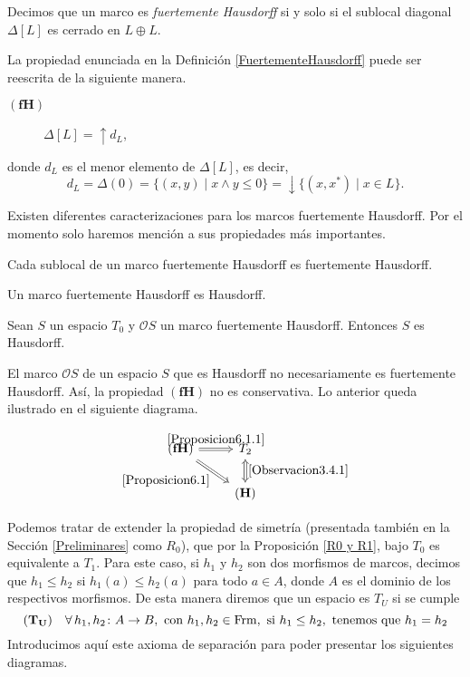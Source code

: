 \documentclass{comunicaciones}
\begin{document}
\begin{dfn}\label{FuertementeHausdorff}
    Decimos que un marco es \emph{fuertemente Hausdorff} si y solo si el sublocal diagonal $\Delta[L]$ es cerrado en $L\oplus L$.
\end{dfn}

La propiedad enunciada en la Definición \ref{FuertementeHausdorff} puede ser reescrita de la siguiente manera.

\begin{description}
    \item[$\mathbf{(fH)}$] $\Delta[L]=\uparrow d_L$, 
\end{description}
donde $d_L$ es el menor elemento de $\Delta[L]$, es decir,
\[
d_L=\Delta(0)=\{(x, y)\mid x\wedge y\leq 0\}=\downarrow\{(x, x^*)\mid x\in L\}.
\]

Existen diferentes caracterizaciones para los marcos fuertemente Hausdorff. Por el momento solo haremos mención a sus propiedades más importantes.

\begin{prop}\label{Proposicion5.3.4}
    Cada sublocal de un marco fuertemente Hausdorff es fuertemente Hausdorff.
\end{prop}

\begin{prop}\label{Proposicion6.1}
    Un marco fuertemente Hausdorff es Hausdorff.
\end{prop}

\begin{prop}\label{Proposicion6.1.1}
    Sean $S$ un espacio $T_0$ y $\mathcal{O}S$ un marco fuertemente Hausdorff. Entonces $S$ es Hausdorff.
\end{prop}

El marco $\mathcal{O}S$ de un espacio $S$ que es Hausdorff no necesariamente es fuertemente Hausdorff. Así, la propiedad $\mathbf{(fH)}$ no es conservativa. Lo anterior queda ilustrado en el siguiente diagrama.

\[\begin{tikzcd}
	{\mathbf{(fH)}} & {T_2} \\
	& {\mathbf{(H)}}
	\arrow["{\ref{Proposicion6.1.1}}", Rightarrow, from=1-1, to=1-2]
	\arrow["{\ref{Proposicion6.1}}"', Rightarrow, from=1-1, to=2-2]
	\arrow["{\ref{Observacion3.4.1}}", Leftrightarrow, from=1-2, to=2-2]
\end{tikzcd}\]

Podemos tratar de extender la propiedad de simetría (presentada también en la Sección \ref{Preliminares} como $R_0$), que por la Proposición \ref{R0 y R1}, bajo $T_0$ es equivalente a $T_1$. Para este caso, si $h_1$ y $h_2$ son dos morfismos de marcos, decimos que $h_1\leq h_2$ si $h_1(a)\leq h_2(a)$ para todo $a\in A$, donde $A$ es el dominio de los respectivos morfismos. De esta manera diremos que un espacio es $T_U$ si se cumple
\[
(\mathbf{T_U})\quad \forall\, h_1, h_2\colon A\to B, \mbox{ con } h_1,h_2\in \mathrm{Frm}, \mbox{ si } h_1\leq h_2, \mbox{ tenemos que }
h_1=h_2
\]
Introducimos aquí este axioma de separación para poder presentar los siguientes diagramas.
\end{document}
